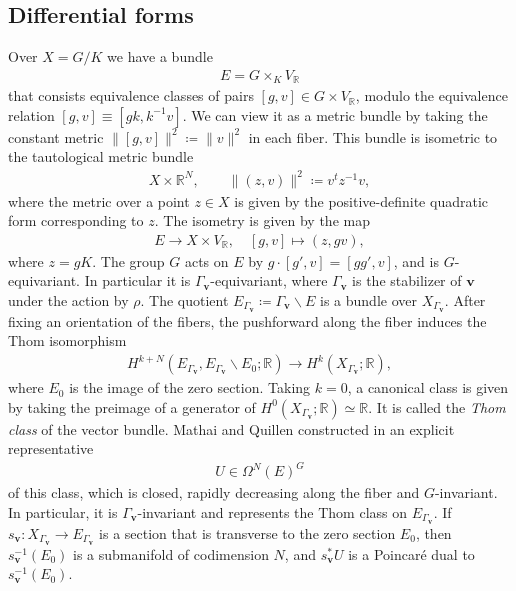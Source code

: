 \documentclass[twoside,a4paper,10pt]{article} %
\newcommand{\8}{\infty}
\newcommand{\vbf}{\mathbf{v}}
\newcommand{\R}{\mathbb{R}}
\theoremstyle{mytheoremstyle}
\theoremstyle{remark}
\numberwithin{equation}{section}
\begin{document}
\subsection{Differential forms} \label{Mathai-Quillen} Over $X=G/K$ we have a bundle
\begin{align}
E=G \times_{K} V_\R
\end{align}
that consists equivalence classes of pairs $[g,v] \in G \times V_\R $,  modulo the equivalence relation $[g,v] \equiv [gk,k^{-1}v]$. We can view it as a metric bundle by taking the constant metric $\lVert [g,v] \rVert^2 \coloneqq \lVert v \rVert^2$ in each fiber.  This bundle is isometric to the tautological metric bundle
\begin{align}
X \times \R^N, \qquad \lVert (z,v) \rVert^2 \coloneqq v^tz^{-1}v,
\end{align}
where the metric over a point $z \in X$ is given by the positive-definite quadratic form corresponding to $z$.  The isometry is given by the map 
\begin{align}
E \longrightarrow X \times V_\R, \quad  [g,v] \longmapsto (z,gv),
\end{align}
where $z=gK$. The group $G$ acts on $E$ by $g \cdot [g',v]=[gg',v]$, and is $G$-equivariant. In particular it is $\Gamma_\vbf$-equivariant, where $\Gamma_\vbf$ is the stabilizer of $\vbf$ under the action by $\rho$. The quotient $E_{\Gamma_\vbf} \coloneqq {\Gamma_\vbf}  \backslash E$ is a bundle over $X_{\Gamma_\vbf}$. After fixing an orientation of the fibers, the pushforward along the fiber induces the Thom isomorphism
\begin{align}
H^{k+N}(E_{\Gamma_\vbf} ,E_{\Gamma_\vbf}  \smallsetminus E_0;\R) \longrightarrow H^k(X_{\Gamma_\vbf} ;\R),
\end{align}
where $E_0$ is the image of the zero section. Taking $k=0$, a canonical class is given by taking the preimage of a generator of $H^0(X_{\Gamma_\vbf} ;\R) \simeq \R$. It is called the {\em Thom class} of the vector bundle. Mathai and Quillen constructed in \cite{MQ86} an explicit representative
\begin{align}
U \in \Omega^{N}(E)^{G} 
\end{align}
of this class, which is closed, rapidly decreasing along the fiber and $G$-invariant. In particular, it is $\Gamma_\vbf$-invariant and represents the Thom class on $E_{\Gamma_\vbf}$. If $s_\vbf \colon X_{\Gamma_\vbf}  \longrightarrow E_{\Gamma_\vbf} $ is a section that is transverse to the zero section $E_0$, then $s_\vbf^{-1}(E_0)$ is a submanifold of codimension $N$, and $s_\vbf^\ast U$ is a Poincaré dual to $s_\vbf^{-1}(E_0)$.
\end{document}
